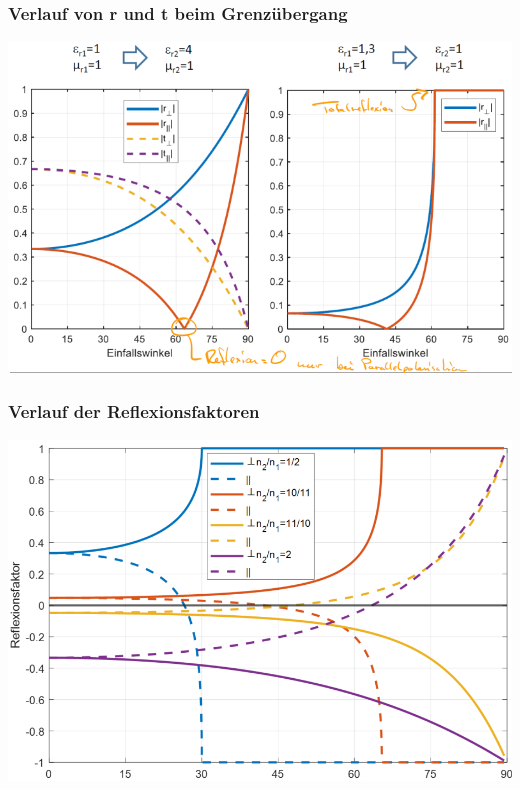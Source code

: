 \subsubsection{Verlauf von r und t beim Grenzübergang}

\includegraphics[width=\columnwidth]{Figures/Totalreflexion_Diagramm.png}

\subsubsection{Verlauf der Reflexionsfaktoren}
\includegraphics[width=\columnwidth]{Figures/Verlauf_Reflexionsfaktoren.png}

\newpage

